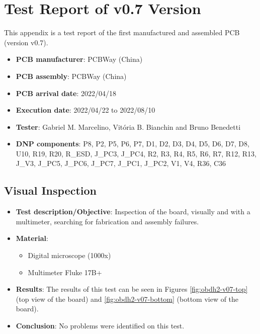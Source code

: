 %
%
%
%
%

%
%
%
%
%

\chapter{Test Report of v0.7 Version} \label{anx:test-report-v07}

This appendix is a test report of the first manufactured and assembled PCB (version v0.7).

\begin{itemize}
    \item \textbf{PCB manufacturer}: PCBWay (China)
    \item \textbf{PCB assembly}: PCBWay (China)
    \item \textbf{PCB arrival date}: 2022/04/18
    \item \textbf{Execution date}: 2022/04/22 to 2022/08/10
    \item \textbf{Tester}: Gabriel M. Marcelino, Vitória B. Bianchin and Bruno Benedetti
    \item \textbf{DNP components}: P8, P2, P5, P6, P7, D1, D2, D3, D4, D5, D6, D7, D8, U10, R19, R20, R\_ESD, J\_PC3, J\_PC4, R2, R3, R4, R5, R6, R7, R12, R13, J\_V3, J\_PC5, J\_PC6, J\_PC7, J\_PC1, J\_PC2, V1, V4, R36, C36
\end{itemize}

\section{Visual Inspection}

\begin{itemize}
    \item \textbf{Test description/Objective}: Inspection of the board, visually and with a multimeter, searching for fabrication and assembly failures.
    \item \textbf{Material}:
        \begin{itemize}
            \item Digital microscope (1000x)
            \item Multimeter Fluke 17B+
        \end{itemize}
    \item \textbf{Results}: The results of this test can be seen in Figures \ref{fig:obdh2-v07-top} (top view of the board) and \ref{fig:obdh2-v07-bottom} (bottom view of the board).
    \item \textbf{Conclusion}: No problems were identified on this test.
\end{itemize}

